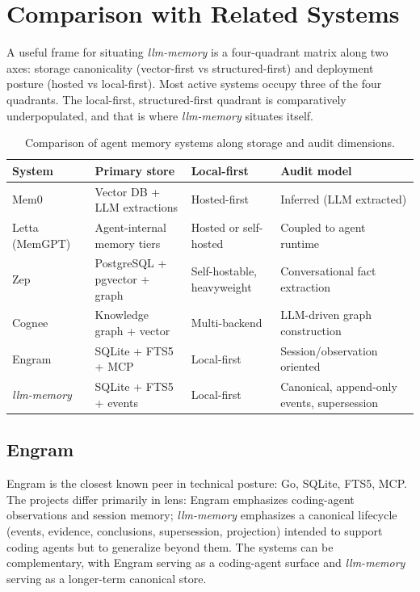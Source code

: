 \documentclass[11pt,a4paper]{article}
\begin{document}
\section{Comparison with Related Systems}

A useful frame for situating \textit{llm-memory} is a four-quadrant matrix along two axes: storage canonicality (vector-first vs structured-first) and deployment posture (hosted vs local-first). Most active systems occupy three of the four quadrants. The local-first, structured-first quadrant is comparatively underpopulated, and that is where \textit{llm-memory} situates itself.

\begin{table}[h]
\centering
\small
\renewcommand{\arraystretch}{1.25}
\begin{tabularx}{\linewidth}{@{}lXXX@{}}
\toprule
\textbf{System} & \textbf{Primary store} & \textbf{Local-first} & \textbf{Audit model} \\
\midrule
Mem0~\cite{mem0} & Vector DB + LLM extractions & Hosted-first & Inferred (LLM extracted) \\
Letta (MemGPT)~\cite{packer2023memgpt} & Agent-internal memory tiers & Hosted or self-hosted & Coupled to agent runtime \\
Zep~\cite{zep} & PostgreSQL + pgvector + graph & Self-hostable, heavyweight & Conversational fact extraction \\
Cognee~\cite{cognee} & Knowledge graph + vector & Multi-backend & LLM-driven graph construction \\
Engram & SQLite + FTS5 + MCP & Local-first & Session/observation oriented \\
\textit{llm-memory}~\cite{llmmemoryrepo} & SQLite + FTS5 + events & Local-first & Canonical, append-only events, supersession \\
\bottomrule
\end{tabularx}
\caption{Comparison of agent memory systems along storage and audit dimensions.}
\label{tab:comparison}
\end{table}

\subsection{Engram}

Engram is the closest known peer in technical posture: Go, SQLite, FTS5, MCP. The projects differ primarily in lens: Engram emphasizes coding-agent observations and session memory; \textit{llm-memory} emphasizes a canonical lifecycle (events, evidence, conclusions, supersession, projection) intended to support coding agents but to generalize beyond them. The systems can be complementary, with Engram serving as a coding-agent surface and \textit{llm-memory} serving as a longer-term canonical store.
\end{document}
